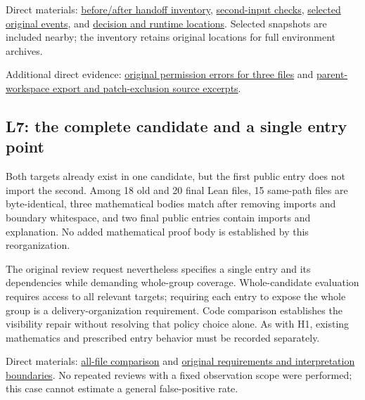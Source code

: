 Direct materials: \href{research/analysis_20260915/final_research_supplement_20260915/evidence/handoff_inventory.json}{before/after handoff inventory}, \href{research/analysis_20260915/final_research_supplement_20260915/evidence/M2_information_checks.json}{second-input checks}, \href{research/analysis_20260915/final_research_supplement_20260915/evidence/selected_events.json}{selected original events}, and \href{research/analysis_20260915/final_research_supplement_20260915/evidence/DECISION_SOURCES.zh-CN.md}{decision and runtime locations}. Selected snapshots are included nearby; the inventory retains original locations for full environment archives.

Additional direct evidence: \href{verification/revision30/M2_export.stderr.txt}{original permission errors for three files} and \href{verification/revision30/M2_runtime_excerpts.json}{parent-workspace export and patch-exclusion source excerpts}.

\subsection[L7: the complete candidate and a single entry point]{\texorpdfstring{\protect\hypertarget{u4}{}L7: the complete candidate and a single entry point}{L7: the complete candidate and a single entry point}}
Both targets already exist in one candidate, but the first public entry does not import the second. Among 18 old and 20 final Lean files, 15 same-path files are byte-identical, three mathematical bodies match after removing imports and boundary whitespace, and two final public entries contain imports and explanation. No added mathematical proof body is established by this reorganization.

The original review request nevertheless specifies a single entry and its dependencies while demanding whole-group coverage. Whole-candidate evaluation requires access to all relevant targets; requiring each entry to expose the whole group is a delivery-organization requirement. Code comparison establishes the visibility repair without resolving that policy choice alone. As with H1, existing mathematics and prescribed entry behavior must be recorded separately.

Direct materials: \href{research/analysis_20260915/two_pass_review_20260915/round1/l7_all_files.json}{all-file comparison} and \href{research/analysis_20260915/two_pass_review_20260915/review/STANDARDS.zh-CN.md}{original requirements and interpretation boundaries}. No repeated reviews with a fixed observation scope were performed; this case cannot estimate a general false-positive rate.

